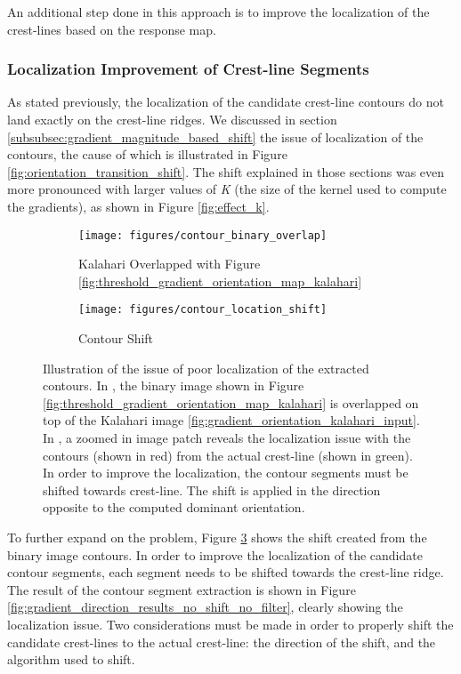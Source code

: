 An additional step done in this approach is to improve the localization of the crest-lines based on the response map.

\subsubsection{Localization Improvement of Crest-line Segments}

As stated previously, the localization of the candidate crest-line contours do not land exactly on the crest-line ridges. We discussed in section \ref{subsubsec:gradient_magnitude_based_shift} the issue of localization of the contours, the cause of which is illustrated in Figure \ref{fig:orientation_transition_shift}. The shift explained in those sections was even more pronounced with larger values of \emph{K} (the size of the kernel used to compute the gradients), as shown in Figure \ref{fig:effect_k}. 

\begin{figure}
	\centering
	\begin{subfigure}{0.48\textwidth}
		\centering
		\texttt{[image: figures/contour\_binary\_overlap]}
		\caption{Kalahari Overlapped with Figure \ref{fig:threshold_gradient_orientation_map_kalahari}}
		\label{fig:kalahari_shift_overlap}
	\end{subfigure}
	\begin{subfigure}{0.48\textwidth}
		\centering
		\texttt{[image: figures/contour\_location\_shift]}
		\caption{ Contour Shift }
		\label{fig:contour_location_shift}
	\end{subfigure}
	\caption{ Illustration of the issue of poor localization of the extracted contours. In , the binary image shown in Figure \ref{fig:threshold_gradient_orientation_map_kalahari} is overlapped on top of the Kalahari image \ref{fig:gradient_orientation_kalahari_input}. In , a zoomed in image patch reveals the localization issue with the contours (shown in red) from the actual crest-line (shown in green). In order to improve the localization, the contour segments must be shifted towards crest-line. The shift is applied in the direction opposite to the computed dominant orientation. }
	\label{fig:shifting_contours_to_crest_lines}
\end{figure}

To further expand on the problem, Figure \ref{fig:shifting_contours_to_crest_lines} shows the shift created from the binary image contours. In order to improve the localization of the candidate contour segments, each segment needs to be shifted towards the crest-line ridge. The result of the contour segment extraction is shown in Figure \ref{fig:gradient_direction_results_no_shift_no_filter}, clearly showing the localization issue. Two considerations must be made in order to properly shift the candidate crest-lines to the actual crest-line: the direction of the shift, and the algorithm used to shift.

